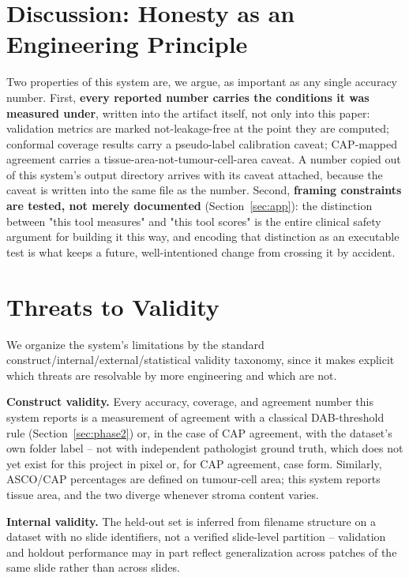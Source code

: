 \documentclass[conference]{IEEEtran}
\begin{document}
\section{Discussion: Honesty as an Engineering Principle}

Two properties of this system are, we argue, as important as any single
accuracy number. First, \textbf{every reported number carries the
conditions it was measured under}, written into the artifact itself, not
only into this paper: validation metrics are marked not-leakage-free at
the point they are computed; conformal coverage results carry a
pseudo-label calibration caveat; CAP-mapped agreement carries a
tissue-area-not-tumour-cell-area caveat. A number copied out of this
system's output directory arrives with its caveat attached, because the
caveat is written into the same file as the number. Second, \textbf{framing
constraints are tested, not merely documented} (Section~\ref{sec:app}): the
distinction between "this tool measures" and "this tool scores" is the
entire clinical safety argument for building it this way, and encoding
that distinction as an executable test is what keeps a future,
well-intentioned change from crossing it by accident.

\section{Threats to Validity}
\label{sec:threats}

We organize the system's limitations by the standard
construct/internal/external/statistical validity taxonomy, since it makes
explicit which threats are resolvable by more engineering and which are
not.

\textbf{Construct validity.} Every accuracy, coverage, and agreement number
this system reports is a measurement of agreement with a classical
DAB-threshold rule (Section~\ref{sec:phase2}) or, in the case of CAP
agreement, with the dataset's own folder label -- not with independent
pathologist ground truth, which does not yet exist for this project in
pixel or, for CAP agreement, case form. Similarly, ASCO/CAP percentages
are defined on tumour-cell area; this system reports tissue area, and the
two diverge whenever stroma content varies.

\textbf{Internal validity.} The held-out set is inferred from filename
structure on a dataset with no slide identifiers, not a verified
slide-level partition -- validation and holdout performance may in part
reflect generalization across patches of the same slide rather than
across slides.
\end{document}

